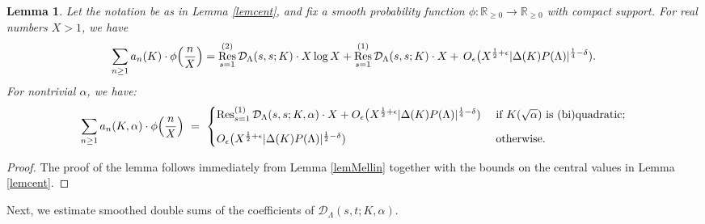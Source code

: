 \documentclass[10pt]{article}
\theoremstyle{plain}
\newtheorem{lemma}[thm]{Lemma}
\theoremstyle{definition}
\theoremstyle{remark}
\DeclareMathOperator{\Res}{Res}
\def\Disc{{\Delta}}
\def\R{{\mathbb R}}
\def\cD{{\mathcal D}}
\begin{document}
\begin{lemma}\label{residues}
Let the notation be as in Lemma \ref{lemcent}, and fix a smooth probability function $\phi:\R_{\geq 0}\to\R_{\geq 0}$ with
compact support. For real numbers $X>1$, we have
\begin{equation*}
\displaystyle\sum_{n\geq 1}a_{n}(K)\cdot  \phi\Bigl(\frac{n}{X}\Bigr)
= \Res^{(2)}_{s=1} \cD_\Lambda(s,s;K)\cdot X \log X+\Res^{(1)}_{s=1}
\cD_\Lambda(s,s;K)\cdot X +\,
O_\epsilon\bigl(X^{\frac12+\epsilon}|\Delta(K)P(\Lambda)|^{\frac14-\delta}).
\end{equation*}
For nontrivial $\alpha$, we have:
\begin{equation*}
\sum_{n\geq 1}a_{n}(K,\alpha)\cdot\phi\Bigl(\frac{n}{X}\Bigr)\,\,=\,\, \begin{cases}
\Res^{(1)}_{s=1}\cD_\Lambda(s,s;K,\alpha)\cdot X+
O_\epsilon\bigl(X^{\frac12+\epsilon}|\Disc(K)P(\Lambda)|^{\frac14-\delta}) &
\mbox{ if $K(\sqrt{\alpha})$ is (bi)quadratic;} \vspace{.1in}\\
 O_\epsilon
\bigl(X^{\frac12+\epsilon}|\Delta(K)P(\Lambda)|^{\frac12-\delta}) & \mbox{ otherwise.}
\end{cases}
\end{equation*}
\end{lemma}
\begin{proof}
The proof of the lemma follows immediately from Lemma \ref{lemMellin}
together with the bounds on the central values in Lemma \ref{lemcent}.
\end{proof}

Next, we estimate smoothed double sums of the coefficients of
$\cD_\Lambda(s,t;K,\alpha)$. 
\end{document}
